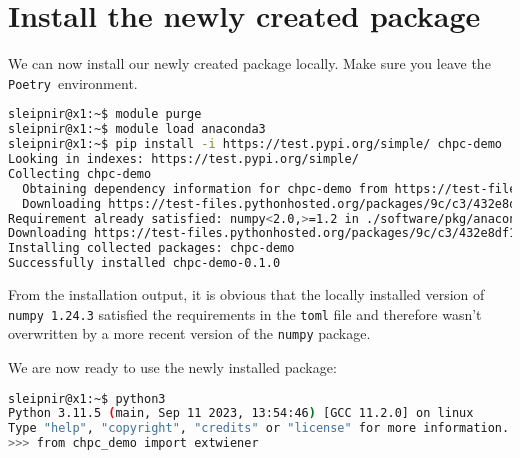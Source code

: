 \documentclass[10pt]{article}
\newcommand{\POETRY}{\texttt{Poetry}}
\begin{document}
\section{Install the newly created package}
We can now install our newly created package locally. Make sure you leave the \POETRY\ environment.
\begin{lstlisting}[language=bash]
sleipnir@x1:~$ module purge
sleipnir@x1:~$ module load anaconda3
sleipnir@x1:~$ pip install -i https://test.pypi.org/simple/ chpc-demo
Looking in indexes: https://test.pypi.org/simple/
Collecting chpc-demo
  Obtaining dependency information for chpc-demo from https://test-files.pythonhosted.org/packages/9c/c3/432e8df10a5db0e3d6b6963c41638f8b9e6b7b24d81fd759932e0dfa7d3e/chpc_demo-0.1.0-py3-none-any.whl.metadata
  Downloading https://test-files.pythonhosted.org/packages/9c/c3/432e8df10a5db0e3d6b6963c41638f8b9e6b7b24d81fd759932e0dfa7d3e/chpc_demo-0.1.0-py3-none-any.whl.metadata (664 bytes)
Requirement already satisfied: numpy<2.0,>=1.2 in ./software/pkg/anaconda3/2023.09/lib/python3.11/site-packages (from chpc-demo) (1.24.3)
Downloading https://test-files.pythonhosted.org/packages/9c/c3/432e8df10a5db0e3d6b6963c41638f8b9e6b7b24d81fd759932e0dfa7d3e/chpc_demo-0.1.0-py3-none-any.whl (3.4 kB)
Installing collected packages: chpc-demo
Successfully installed chpc-demo-0.1.0
\end{lstlisting}
From the installation output, it is obvious that the locally installed version of \texttt{numpy 1.24.3} satisfied the requirements in the \texttt{toml} file
and therefore wasn't overwritten by a more recent version of the \texttt{numpy} package.

We are now ready to use the newly installed package:
\begin{lstlisting}[language=bash]
sleipnir@x1:~$ python3
Python 3.11.5 (main, Sep 11 2023, 13:54:46) [GCC 11.2.0] on linux
Type "help", "copyright", "credits" or "license" for more information.
>>> from chpc_demo import extwiener
\end{lstlisting}



\end{document}
